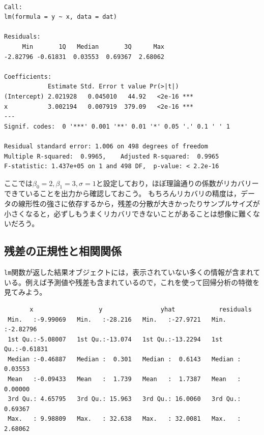 \documentclass[
  a4paper,
]{ltjsbook}
\newenvironment{Shaded}{\begin{snugshade}}{\end{snugshade}}
\newcommand{\AttributeTok}[1]{\textcolor[rgb]{0.40,0.45,0.13}{#1}}
\newcommand{\FunctionTok}[1]{\textcolor[rgb]{0.28,0.35,0.67}{#1}}
\newcommand{\NormalTok}[1]{\textcolor[rgb]{0.00,0.23,0.31}{#1}}
\newcommand{\OtherTok}[1]{\textcolor[rgb]{0.00,0.23,0.31}{#1}}
\newcommand{\SpecialCharTok}[1]{\textcolor[rgb]{0.37,0.37,0.37}{#1}}
\begin{document}
\begin{verbatim}

Call:
lm(formula = y ~ x, data = dat)

Residuals:
     Min       1Q   Median       3Q      Max 
-2.82796 -0.61831  0.03553  0.69367  2.68062 

Coefficients:
            Estimate Std. Error t value Pr(>|t|)    
(Intercept) 2.021928   0.045010   44.92   <2e-16 ***
x           3.002194   0.007919  379.09   <2e-16 ***
---
Signif. codes:  0 '***' 0.001 '**' 0.01 '*' 0.05 '.' 0.1 ' ' 1

Residual standard error: 1.006 on 498 degrees of freedom
Multiple R-squared:  0.9965,    Adjusted R-squared:  0.9965 
F-statistic: 1.437e+05 on 1 and 498 DF,  p-value: < 2.2e-16
\end{verbatim}

ここでは\(\beta_0 =2, \beta_1=3, \sigma = 1\)と設定しており，ほぼ理論通りの係数がリカバリーできていることを出力から確認しておこう。
もちろんリカバリの精度は，データの線形性の強さに依存するから，残差の分散が大きかったりサンプルサイズが小さくなると，必ずしもうまくリカバリできないことがあることは想像に難くないだろう。

\subsection{残差の正規性と相関関係}\label{ux6b8bux5deeux306eux6b63ux898fux6027ux3068ux76f8ux95a2ux95a2ux4fc2}

\texttt{lm}関数が返した結果オブジェクトには，表示されていない多くの情報が含まれている。例えば予測値や残差も含まれているので，これを使って回帰分析の特徴を見てみよう。

\begin{Shaded}
\end{Shaded}

\begin{verbatim}
       x                  y                yhat            residuals       
 Min.   :-9.99069   Min.   :-28.216   Min.   :-27.9721   Min.   :-2.82796  
 1st Qu.:-5.08007   1st Qu.:-13.074   1st Qu.:-13.2294   1st Qu.:-0.61831  
 Median :-0.46887   Median :  0.301   Median :  0.6143   Median : 0.03553  
 Mean   :-0.09433   Mean   :  1.739   Mean   :  1.7387   Mean   : 0.00000  
 3rd Qu.: 4.65795   3rd Qu.: 15.963   3rd Qu.: 16.0060   3rd Qu.: 0.69367  
 Max.   : 9.98809   Max.   : 32.638   Max.   : 32.0081   Max.   : 2.68062  
\end{verbatim}
\end{document}
